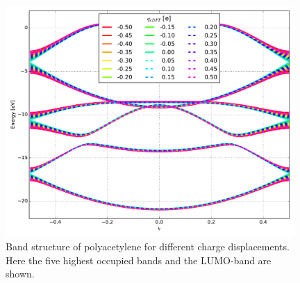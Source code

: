 \begin{figure}[!p]
	\centering
	\includegraphics[width = 11cm]{Images/polyacetylene/charging/band_structure_q_1}
	\caption{Band structure of polyacetylene for different charge displacements. Here the five highest occupied bands and the LUMO-band are shown.}
	\label{image_polyacetylene_band_structure_charging}
\end{figure}
